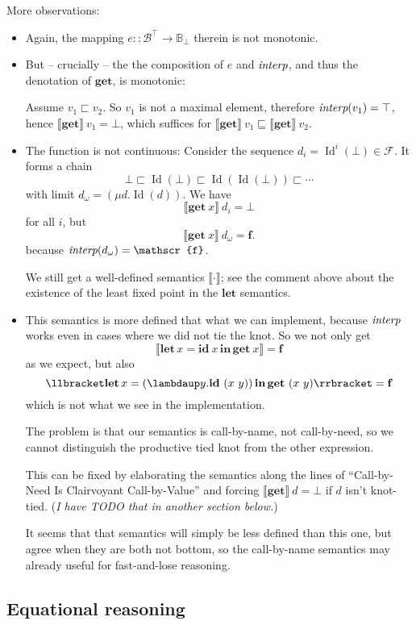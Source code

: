 \documentclass[manuscript,screen,acmsmall,nonacm]{acmart}
\newcommand{\syntax}[1]{\mathbf{#1}}
\newcommand{\slambda}{\syntax{\lambdaup}}
\newcommand{\sLet}[3]{\syntax{let}\,#1=#2\,\syntax{in}\,#3}
\newcommand{\sGet}{\syntax{get}}
\newcommand{\sId}{\syntax{id}}
\newcommand{\dBool}{\mathbb B}
\newcommand{\dFalse}{\mathbf{f}}
\newcommand{\rBool}{\mathscr B}
\newcommand{\rFalse}{\mathscr{f}}
\newcommand{\dRBool}{\mathcal F}
\newcommand{\dId}{\operatorname{Id}}
\newcommand{\D}[1]{\llbracket #1 \rrbracket}
\begin{document}
More observations:
\begin{itemize}
\item Again, the mapping $e : \colon \rBool^\top \to \dBool_\bot$ therein is not monotonic.
\item But -- crucially -- the the composition of $e$ and $\operatorname{\textit{interp}}$, and thus the denotation of $\sGet$, is monotonic:

Assume
$v_1 \sqsubset v_2$.
So $v_1$ is not a maximal element, therefore $\operatorname{\textit{interp}}(v_1) = \top$, hence $\D{\sGet}~v_1 = \bot$, which suffices for
$\D{\sGet} ~ v_1  \sqsubseteq \D{\sGet} ~ v_2$.

\item The function is not continuous: Consider the sequence $d_i = \dId^i(\bot) \in \dRBool$. It forms a chain
\[
\bot
\sqsubset \dId(\bot)
\sqsubset \dId(\dId(\bot))
\sqsubset \cdots
\]
with limit $d_\omega = (\mu d. \dId(d))$. We have
\[
\D{\sGet~x}~ d_i = \bot
\]
for all $i$, but
\[
\D{\sGet~x}~ d_\omega = \dFalse.
\]
because $\interp(d_\omega) = \rFalse$.

We still get a well-defined semantics $\D\cdot$; see the comment above about the existence of the least fixed point in the $\syntax{let}$ semantics.

\item This semantics is more defined that what we can implement, because $\operatorname{\textit{interp}}$ works even in cases where we did not tie the knot. So we not only get
\[
\D{\sLet{x}{\sId~x}{\sGet~x}} = \dFalse
\]
as we expect, but also
\[
\D{\sLet{x}{(\slambda y. \sId~(x~y))}{\sGet~(x~y)}} = \dFalse
\]
which is not what we see in the implementation.

The problem is that our semantics is call-by-name, not call-by-need, so we cannot distinguish the productive tied knot from the other expression.

This can be fixed by elaborating the semantics along the lines of “Call-by-Need Is Clairvoyant Call-by-Value” and forcing  $\D{\sGet}~d = \bot$ if $d$ isn't knot-tied.
(\emph{I have TODO that in another section below.})

It seems that that semantics will simply be less defined than this one, but agree when they are both not bottom, so the call-by-name semantics may already useful for fast-and-lose reasoning.

\end{itemize}

\subsection{Equational reasoning}\label{sec:equational-reasoning}
\end{document}
